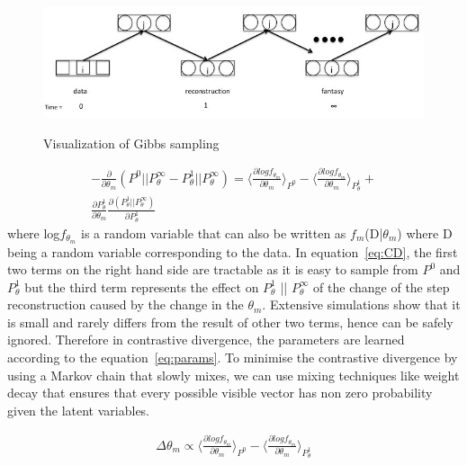 \documentclass{sig-alternate}
\begin{document}
 \begin{figure}[t]
\centering
\includegraphics[width=12cm,height=4cm]{gibbs.jpg}
\caption{Visualization of Gibbs sampling}
\label{fig:gibbs}
\end{figure}

\begin{align}
- \frac {\partial} {\partial\theta_{m}} (P^0 || P^\infty_\theta - P^1_\theta || P^\infty_\theta) = \langle \frac {\partial log f_{\theta_{m}}}{\partial \theta_m} \rangle_{P^0} - \langle \frac {\partial log f_{\theta_{m}}}{\partial \theta_m} \rangle_{P^1_\theta} + \nonumber \\
 \frac{\partial{P^1_\theta}}{\partial\theta_m} \frac{\partial(P^1_\theta || P^\infty_\theta)}{\partial{P^1_\theta}}
 \label{eq:CD}
\end{align}
where log$f_{\theta_{m}}$ is a random variable that can also be written as $f_m$(D|$\theta_m$) where D being a random variable corresponding to the data.
In equation~\ref{eq:CD}, the first two terms on the right hand side are tractable as it is easy to sample from $P^0$ and $P^1_\theta$ but the third term represents the effect on $P^1_\theta$ || $P^\infty_\theta$ of the change of the step reconstruction caused by the change in the $\theta_m$. Extensive simulations show that it is small and rarely differs from the result of other two terms, hence can be safely ignored. Therefore in contrastive divergence, the parameters are learned according to the equation~\ref{eq:params}. To minimise the contrastive divergence by using a Markov chain that slowly mixes, we can use mixing techniques like weight decay that ensures that every possible visible vector has non zero probability given the latent variables.

\begin{align}
\Delta\theta_m \propto \langle \frac {\partial log f_{\theta_{m}}}{\partial \theta_m}\rangle_{P^0} - \langle \frac {\partial log f_{\theta_{m}}}{\partial \theta_m} \rangle_{P^1_\theta} \label{eq:params}
\end{align}
\end{document}
